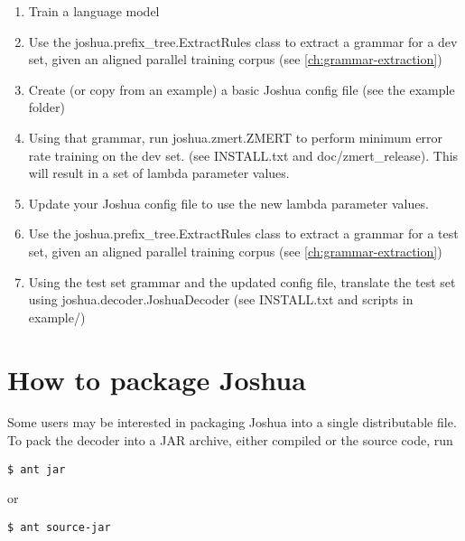  \begin{enumerate}
 \item Train a language model
 \item Use the joshua.prefix\_tree.ExtractRules class to extract a grammar for a dev set, given an aligned parallel training corpus (see \cref{ch:grammar-extraction})
 \item Create (or copy from an example) a basic Joshua config file (see the example folder)
 \item Using that grammar, run joshua.zmert.ZMERT to perform minimum error rate training on the dev set. (see INSTALL.txt and doc/zmert\_release). This will result in a set of lambda parameter values.
\item Update your Joshua config file to use the new lambda parameter values.
\item Use the joshua.prefix\_tree.ExtractRules class to extract a grammar for a test set, given an aligned parallel training corpus (see \cref{ch:grammar-extraction})
\item Using the test set grammar and the updated config file, translate the test set using joshua.decoder.JoshuaDecoder (see INSTALL.txt and scripts in example/)
 \end{enumerate}


\section{How to package Joshua}

Some users may be interested in packaging Joshua into a single distributable file. To pack the decoder into a JAR archive, either compiled or the source code, run

\begin{verbatim}
$ ant jar
\end{verbatim}

or

\begin{verbatim}
$ ant source-jar
\end{verbatim}
